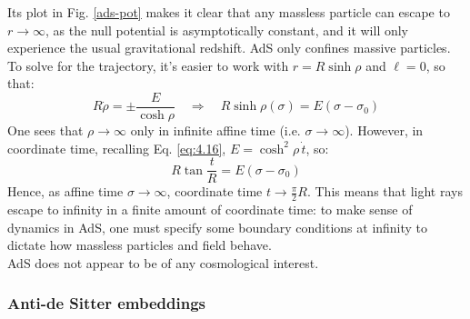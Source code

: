 Its plot in Fig. \ref{ads-pot} makes it clear that any massless particle can escape to $ r \rightarrow \infty $, as the null potential is asymptotically constant, and it will only experience the usual gravitational redshift. AdS only confines massive particles.
To solve for the trajectory, it's easier to work with $ r = R \sinh \rho $ and $ \ell = 0 $, so that:
\begin{equation*}
  R \dot{\rho} = \pm \frac{E}{\cosh \rho}
  \quad \Rightarrow \quad
  R \sinh \rho(\sigma) = E (\sigma - \sigma_0)
\end{equation*}
One sees that $ \rho \rightarrow \infty $ only in infinite affine time (i.e. $ \sigma \rightarrow \infty $). However, in coordinate time, recalling Eq. \ref{eq:4.16}, $ E = \cosh^2 \rho\, \dot{t} $, so:
\begin{equation*}
  R \tan \frac{t}{R} = E (\sigma - \sigma_0)
\end{equation*}
Hence, as affine time $ \sigma \rightarrow \infty $, coordinate time $ t \rightarrow \frac{\pi}{2} R $. This means that light rays escape to infinity in a finite amount of coordinate time: to make sense of dynamics in AdS, one must specify some boundary conditions at infinity to dictate how massless particles and field behave.\\
AdS does not appear to be of any cosmological interest.

\subsubsection{Anti-de Sitter embeddings}

